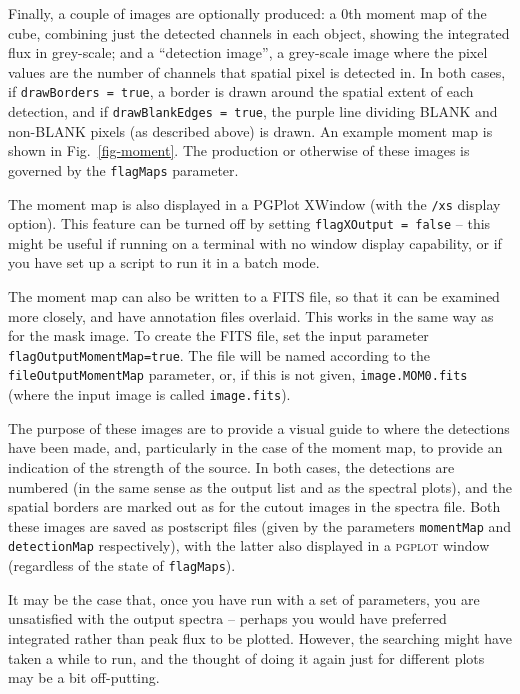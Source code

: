 
Finally, a couple of images are optionally produced: a 0th moment map
of the cube, combining just the detected channels in each object,
showing the integrated flux in grey-scale; and a ``detection image'',
a grey-scale image where the pixel values are the number of channels
that spatial pixel is detected in. In both cases, if
\texttt{drawBorders = true}, a border is drawn around the spatial
extent of each detection, and if \texttt{drawBlankEdges = true}, the
purple line dividing BLANK and non-BLANK pixels (as described above)
is drawn. An example moment map is shown in Fig.~\ref{fig-moment}.
The production or otherwise of these images is governed by the
\texttt{flagMaps} parameter.

The moment map is also displayed in a PGPlot XWindow (with the
\texttt{/xs} display option). This feature can be turned off by
setting \texttt{flagXOutput = false} -- this might be useful if
running \duchamp on a terminal with no window display capability, or
if you have set up a script to run it in a batch mode.

The moment map can also be written to a FITS file, so that it can be
examined more closely, and have annotation files overlaid. This works
in the same way as for the mask image. To create the FITS file, set the
input parameter \texttt{flagOutputMomentMap=true}. The file will be named
according to the \texttt{fileOutputMomentMap} parameter, or, if this is not
given, \texttt{image.MOM0.fits} (where the input image is called
\texttt{image.fits}).

The purpose of these images are to provide a visual guide to where the
detections have been made, and, particularly in the case of the moment
map, to provide an indication of the strength of the source. In both
cases, the detections are numbered (in the same sense as the output
list and as the spectral plots), and the spatial borders are marked
out as for the cutout images in the spectra file. Both these images
are saved as postscript files (given by the parameters
\texttt{momentMap} and \texttt{detectionMap} respectively), with the
latter also displayed in a \textsc{pgplot} window (regardless of the
state of \texttt{flagMaps}).



\label{sec-reuse}

It may be the case that, once you have run \duchamp with a set of
parameters, you are unsatisfied with the output spectra -- perhaps you
would have preferred integrated rather than peak flux to be
plotted. However, the searching might have taken a while to run, and
the thought of doing it again just for different plots may be a bit
off-putting.

